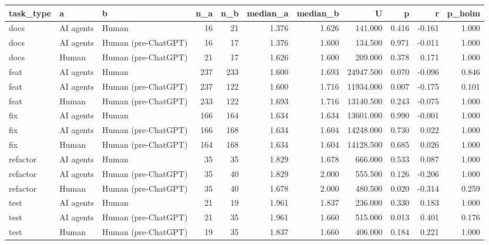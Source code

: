 \begin{tabular}{lllrrrrrrrr}
\toprule
task_type & a & b & n_a & n_b & median_a & median_b & U & p & r & p_holm \\
\midrule
docs & AI agents & Human & 16 & 21 & 1.376 & 1.626 & 141.000 & 0.416 & -0.161 & 1.000 \\
docs & AI agents & Human (pre-ChatGPT) & 16 & 17 & 1.376 & 1.600 & 134.500 & 0.971 & -0.011 & 1.000 \\
docs & Human & Human (pre-ChatGPT) & 21 & 17 & 1.626 & 1.600 & 209.000 & 0.378 & 0.171 & 1.000 \\
feat & AI agents & Human & 237 & 233 & 1.600 & 1.693 & 24947.500 & 0.070 & -0.096 & 0.846 \\
feat & AI agents & Human (pre-ChatGPT) & 237 & 122 & 1.600 & 1.716 & 11934.000 & 0.007 & -0.175 & 0.101 \\
feat & Human & Human (pre-ChatGPT) & 233 & 122 & 1.693 & 1.716 & 13140.500 & 0.243 & -0.075 & 1.000 \\
fix & AI agents & Human & 166 & 164 & 1.634 & 1.634 & 13601.000 & 0.990 & -0.001 & 1.000 \\
fix & AI agents & Human (pre-ChatGPT) & 166 & 168 & 1.634 & 1.604 & 14248.000 & 0.730 & 0.022 & 1.000 \\
fix & Human & Human (pre-ChatGPT) & 164 & 168 & 1.634 & 1.604 & 14128.500 & 0.685 & 0.026 & 1.000 \\
refactor & AI agents & Human & 35 & 35 & 1.829 & 1.678 & 666.000 & 0.533 & 0.087 & 1.000 \\
refactor & AI agents & Human (pre-ChatGPT) & 35 & 40 & 1.829 & 2.000 & 555.500 & 0.126 & -0.206 & 1.000 \\
refactor & Human & Human (pre-ChatGPT) & 35 & 40 & 1.678 & 2.000 & 480.500 & 0.020 & -0.314 & 0.259 \\
test & AI agents & Human & 21 & 19 & 1.961 & 1.837 & 236.000 & 0.330 & 0.183 & 1.000 \\
test & AI agents & Human (pre-ChatGPT) & 21 & 35 & 1.961 & 1.660 & 515.000 & 0.013 & 0.401 & 0.176 \\
test & Human & Human (pre-ChatGPT) & 19 & 35 & 1.837 & 1.660 & 406.000 & 0.184 & 0.221 & 1.000 \\
\bottomrule
\end{tabular}
